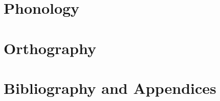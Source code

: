 \begin{spacing}{1}
  
  \frontmatter
  
  
  
  \tableofcontents
  \listoffigures
  \listoftables
  \printglossary[%
  nonumberlist=true
  ]
  \printglossary[%
  type=lang,%
  style=mcolindex,%
  nonumberlist=true,%
  nogroupskip=true]
\end{spacing}
\mainmatter
\part{Phonology}
\label{part:phonology-phonetics}




\part{Orthography}
\label{part:orthography}






\part*{Bibliography and Appendices}
\label{part:appendices}
\begin{spacing}{1}
  \begingroup
  \sloppy
  \printbibliography
  \endgroup
  \appendix
  
  
  
\end{spacing}
